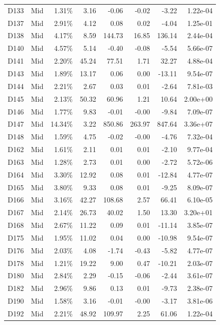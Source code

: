 \begin{tabular}{l l r r r r r r}
D133 & Mid & 1.31\% & 3.16 & -0.06 & -0.02 & -3.22 & 1.22e-04 \\
D137 & Mid & 2.91\% & 4.12 & 0.08 & 0.02 & -4.04 & 1.25e-01 \\
D138 & Mid & 4.17\% & 8.59 & 144.73 & 16.85 & 136.14 & 2.44e-04 \\
D140 & Mid & 4.57\% & 5.14 & -0.40 & -0.08 & -5.54 & 5.66e-07 \\
D141 & Mid & 2.20\% & 45.24 & 77.51 & 1.71 & 32.27 & 4.88e-04 \\
D143 & Mid & 1.89\% & 13.17 & 0.06 & 0.00 & -13.11 & 9.54e-07 \\
D144 & Mid & 2.21\% & 2.67 & 0.03 & 0.01 & -2.64 & 7.81e-03 \\
D145 & Mid & 2.13\% & 50.32 & 60.96 & 1.21 & 10.64 & 2.00e+00 \\
D146 & Mid & 1.77\% & 9.83 & -0.01 & -0.00 & -9.84 & 7.09e-07 \\
D147 & Mid & 14.34\% & 3.22 & 850.86 & 263.97 & 847.64 & 3.36e+07 \\
D148 & Mid & 1.59\% & 4.75 & -0.02 & -0.00 & -4.76 & 7.32e-04 \\
D162 & Mid & 1.61\% & 2.11 & 0.01 & 0.01 & -2.10 & 9.77e-04 \\
D163 & Mid & 1.28\% & 2.73 & 0.01 & 0.00 & -2.72 & 5.72e-06 \\
D164 & Mid & 3.30\% & 12.92 & 0.08 & 0.01 & -12.84 & 4.77e-07 \\
D165 & Mid & 3.80\% & 9.33 & 0.08 & 0.01 & -9.25 & 8.09e-07 \\
D166 & Mid & 3.16\% & 42.27 & 108.68 & 2.57 & 66.41 & 6.10e-05 \\
D167 & Mid & 2.14\% & 26.73 & 40.02 & 1.50 & 13.30 & 3.20e+01 \\
D168 & Mid & 2.67\% & 11.22 & 0.09 & 0.01 & -11.14 & 3.85e-07 \\
D175 & Mid & 1.95\% & 11.02 & 0.04 & 0.00 & -10.98 & 9.54e-07 \\
D176 & Mid & 2.03\% & 4.08 & -1.74 & -0.43 & -5.82 & 4.77e-07 \\
D178 & Mid & 1.21\% & 19.22 & 9.00 & 0.47 & -10.21 & 2.03e-07 \\
D180 & Mid & 2.84\% & 2.29 & -0.15 & -0.06 & -2.44 & 3.61e-07 \\
D182 & Mid & 2.96\% & 9.86 & 0.13 & 0.01 & -9.73 & 2.38e-07 \\
D190 & Mid & 1.58\% & 3.16 & -0.01 & -0.00 & -3.17 & 3.81e-06 \\
D192 & Mid & 2.21\% & 48.92 & 109.97 & 2.25 & 61.06 & 1.22e-04 \\

\end{tabular}
